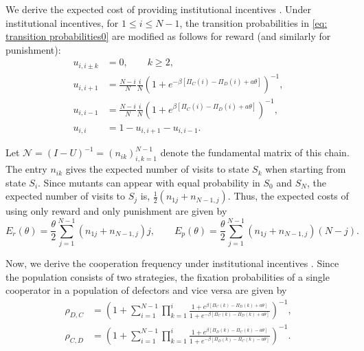 \documentclass{article}
\begin{document}
We derive the expected cost of providing institutional incentives \cite{han2018cost,duonghan2021cost}. 
Under institutional incentives, for $1\le i\le N-1$, the transition probabilities in \eqref{eq: transition probabilities0} are modified as follows for  reward (and similarly for punishment):
\begin{equation}
\label{eq: transition probabilities}
\begin{aligned}
u_{i,i\pm k} &= 0, \qquad k\ge 2, \\
u_{i,i+1} &= \frac{N-i}{N}\frac{i}{N}
\left(1+e^{-\beta[\Pi_C(i)-\Pi_D(i)+a \theta]}\right)^{-1}, \\
u_{i,i-1} &= \frac{N-i}{N}\frac{i}{N}
\left(1+e^{\beta[\Pi_C(i)-\Pi_D(i)+a \theta]}\right)^{-1}, \\
u_{i,i} &= 1-u_{i,i+1}-u_{i,i-1}.
\end{aligned}
\end{equation}

Let $\mathcal{N}=(I-U)^{-1}=(n_{ik})_{i,k=1}^{N-1}$ denote the fundamental matrix of this chain. The entry $n_{ik}$ gives the expected number of visits to state $S_k$ when starting from state $S_i$. Since mutants can appear with equal probability in $S_0$ and $S_N$, the expected number of visits to $S_j$ is,
$
\frac{1}{2}(n_{1j}+n_{N-1,j})
$. Thus, the expected costs of using only reward and only punishment are given by 
\begin{equation}
\label{eq: Er and Ep}
E_r(\theta)=\frac{\theta}{2}\sum_{j=1}^{N-1}(n_{1j}+n_{N-1,j})j,
\qquad
E_p(\theta)=\frac{\theta}{2}\sum_{j=1}^{N-1}(n_{1j}+n_{N-1,j})(N-j).
\end{equation}


Now, we derive the cooperation frequency under institutional incentives \cite{han2018cost}. Since the population consists of two strategies, the fixation probabilities of a single cooperator in a population of defectors and vice versa are given by 
\begin{equation*}
\begin{aligned}
\rho_{D,C}
&=\left(1+\sum_{i=1}^{N-1}
\prod_{k=1}^{i}
\frac{1+e^{\beta[\Pi_C(k)-\Pi_D(k)+a\theta]}}
{1+e^{-\beta[\Pi_C(k)-\Pi_D(k)+a\theta]}}
\right)^{-1}, \\
\rho_{C,D}
&=\left(1+\sum_{i=1}^{N-1}
\prod_{k=1}^{i}
\frac{1+e^{\beta[\Pi_D(k)-\Pi_C(k)-a\theta]}}
{1+e^{-\beta[\Pi_D(k)-\Pi_C(k)-a\theta]}}
\right)^{-1}.
\end{aligned}
\end{equation*}
\end{document}
